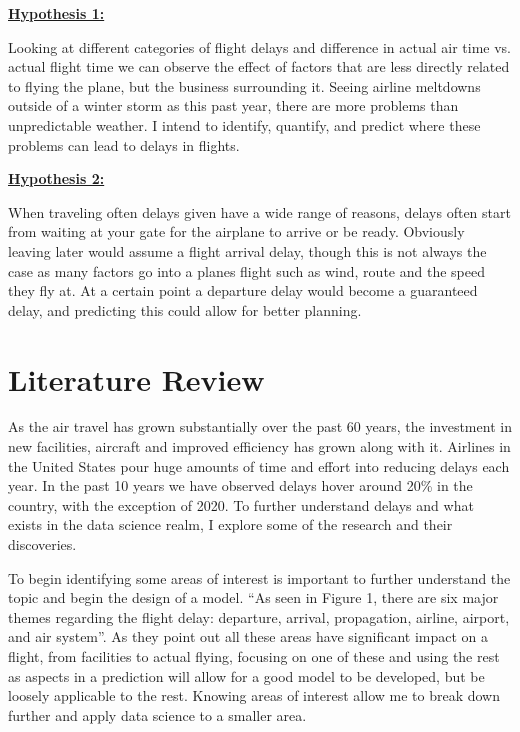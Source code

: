 \documentclass[a4paper,12pt]{article}
\begin{document}
\textbf{\underline{Hypothesis 1:}}

Looking at different categories of flight delays and difference in actual air time vs. actual flight
time we can observe the effect of factors that are less directly related to flying the plane, but the
business surrounding it. Seeing airline meltdowns outside of a winter storm as this past year,
there are more problems than unpredictable weather. I intend to identify, quantify, and predict
where these problems can lead to delays in flights.

\noindent \textbf{\underline{Hypothesis 2:}}

When traveling often delays given have a wide range of reasons, delays often start from waiting at your gate 
for the airplane to arrive or be ready. Obviously leaving later would assume a flight arrival delay, though this is not always the case
as many factors go into a planes flight such as wind, route and the speed they fly at. At a certain point a departure delay 
would become a guaranteed delay, and predicting this could allow for better planning.



\section{Literature Review}

As the air travel has grown substantially over the past 60 years, the investment in new facilities, aircraft and improved efficiency has grown along with it.
Airlines in the United States pour huge amounts of time and effort into reducing delays each year. In the past 10 years we have observed delays hover around 20\%
in the country, with the exception of 2020. To further understand delays and what exists in the data science realm, I explore some of the research and their discoveries.

To begin identifying some areas of interest is important to further understand the topic and begin the design of a model. “As seen in Figure 1,
there are six major themes regarding the flight delay: departure, arrival, propagation, airline, airport, and air system”\cite{doi:10.1080/01441647.2020.1861123}.%
As they point out all these areas have significant impact on a flight, from facilities to actual flying, focusing on one of these and using the rest as aspects in a prediction
will allow for a good model to be developed, but be loosely applicable to the rest. Knowing areas of interest allow me to break down further and apply data science to a smaller area.
\end{document}
